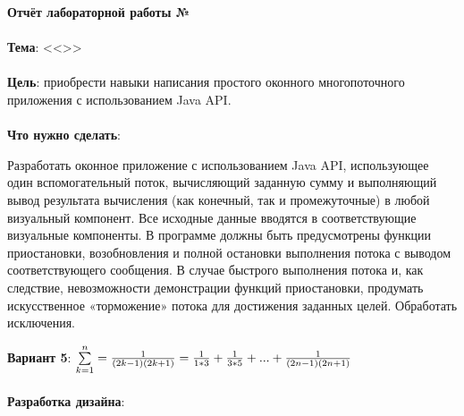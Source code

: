 \documentclass[12pt, a4paper, simple]{eskdtext}
\def \gpiDocTopic {Отчёт лабораторной работы №\gpiDocNum}
\begin{document}
    
    \begin{center}
        \textbf{\gpiDocTopic}
    \end{center}

    \paragraph{} \textbf{Тема}: <<\gpiTopicRep>>

    \paragraph{} \textbf{Цель}:
    приобрести навыки написания простого оконного многопоточного приложения с использованием Java API.

    \paragraph{} \textbf{Что нужно сделать}:

    Разработать оконное приложение с использованием Java API,
    использующее один вспомогательный поток,
    вычисляющий заданную сумму и выполняющий вывод результата вычисления
    (как конечный, так и промежуточные) в любой визуальный компонент.
    Все исходные данные вводятся в соответствующие визуальные компоненты.
    В программе должны быть предусмотрены функции приостановки, возобновления и полной остановки выполнения потока
    с выводом соответствующего сообщения.
    В случае быстрого выполнения потока и, как следствие, невозможности демонстрации функций приостановки,
    продумать искусственное «торможение» потока для достижения заданных целей.
    Обработать исключения.

    \textbf{Вариант 5}:
    $\sum\limits^n_{k=1} = {1 \over {(2k-1)(2k+1)}} = {1 \over 1 * 3} + {1 \over 3 * 5} + ... + {1 \over (2n-1) (2n+1)}$

    \paragraph{} \textbf{Разработка дизайна}:

\end{document}

